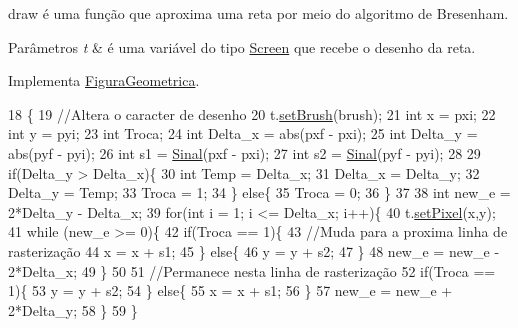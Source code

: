 draw é uma função que aproxima uma reta por meio do algoritmo de Bresenham. 


\begin{DoxyParams}{Parâmetros}
{\em t} & é uma variável do tipo \hyperlink{class_screen}{Screen} que recebe o desenho da reta. \\
\hline
\end{DoxyParams}


Implementa \hyperlink{class_figura_geometrica_a06404670d06d28d12f5f386901186925}{Figura\+Geometrica}.


\begin{DoxyCode}
18 \{
19     \textcolor{comment}{//Altera o caracter de desenho}
20     t.\hyperlink{class_screen_aebc4eb6cb5acf15a0f04c1494622ab23}{setBrush}(brush);
21     \textcolor{keywordtype}{int} x = pxi;
22     \textcolor{keywordtype}{int} y = pyi;
23     \textcolor{keywordtype}{int} Troca;
24     \textcolor{keywordtype}{int} Delta\_x = abs(pxf - pxi);
25     \textcolor{keywordtype}{int} Delta\_y = abs(pyf - pyi);
26     \textcolor{keywordtype}{int} s1 = \hyperlink{class_reta_a0890517655f27827a827c88850f8984e}{Sinal}(pxf - pxi);
27     \textcolor{keywordtype}{int} s2 = \hyperlink{class_reta_a0890517655f27827a827c88850f8984e}{Sinal}(pyf - pyi);
28 
29     \textcolor{keywordflow}{if}(Delta\_y > Delta\_x)\{
30         \textcolor{keywordtype}{int} Temp = Delta\_x;
31         Delta\_x = Delta\_y;
32         Delta\_y = Temp;
33         Troca = 1;
34     \} \textcolor{keywordflow}{else}\{
35         Troca = 0;
36     \}
37 
38     \textcolor{keywordtype}{int} new\_e = 2*Delta\_y - Delta\_x;
39     \textcolor{keywordflow}{for}(\textcolor{keywordtype}{int} i = 1; i <= Delta\_x; i++)\{
40         t.\hyperlink{class_screen_ae6bea81c57a22d226507c3c26fa95ee0}{setPixel}(x,y);
41         \textcolor{keywordflow}{while} (new\_e >= 0)\{
42             \textcolor{keywordflow}{if}(Troca == 1)\{
43                 \textcolor{comment}{//Muda para a proxima linha de rasterização}
44                 x = x + s1;
45             \} \textcolor{keywordflow}{else}\{
46                 y = y + s2;
47             \}
48             new\_e = new\_e - 2*Delta\_x;
49         \}
50 
51         \textcolor{comment}{//Permanece nesta linha de rasterização}
52         \textcolor{keywordflow}{if}(Troca == 1)\{
53             y = y + s2;
54         \} \textcolor{keywordflow}{else}\{
55             x = x + s1;
56         \}
57         new\_e = new\_e + 2*Delta\_y;
58     \}
59 \}
\end{DoxyCode}
\mbox{\label{class_reta_a0890517655f27827a827c88850f8984e}} 
